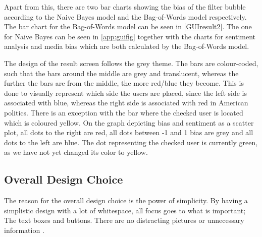 
Apart from this, there are two bar charts showing the bias of the filter bubble
according to the Naive Bayes model and the Bag-of-Words model
respectively. The bar chart for the Bag-of-Words model can be seen in
\autoref{GUIresult2}. The one for Naive Bayes can be seen in
\autoref{app:guifig} together with the charts for sentiment analysis and media
bias which are both calculated by the Bag-of-Words model.


The design of the result screen follows the grey theme. The bars are
colour-coded, such that the bars around the middle are grey and translucent,
whereas the further the bars are from the middle, the more red/blue they become.
This is done to visually represent which side the users are placed, since the
left side is associated with blue, whereas the right side is associated with red
in American politics. There is an exception with the bar where the checked user
is located which is coloured yellow. On the graph depicting bias and sentiment
as a scatter plot, all dots to the right are red, all dots between -1 and 1 bias
are grey and all dots to the left are blue. The dot representing the checked
user is currently green, as we have not yet changed its color to yellow.

\subsection{Overall Design Choice}
The reason for the overall design choice is the power of simplicity. By having a
simplistic design with a lot of whitespace, all focus goes to what is
important; The text boxes and buttons. There are no distracting
pictures or unnecessary information \citep[p. 26 \& 32]{WebUI}.\\